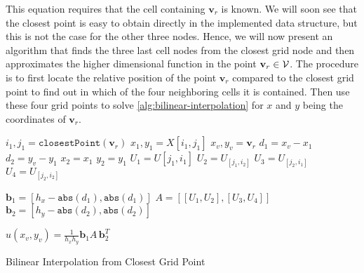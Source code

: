 This equation requires that the cell containing $\mathbf{v}_r$ is known. We will soon see that the closest point is easy to obtain directly in the implemented data structure, but this is not the case for the other three nodes. Hence, we will now present an algorithm that finds the three last cell nodes from the closest grid node and then approximates the higher dimensional function in the point $\mathbf{v}_r \in \mathcal{V}$. The procedure is to first locate the relative position of the point $\mathbf{v}_r$ compared to the closest grid point to find out in which of the four neighboring cells it is contained. Then use these four grid points to solve \eqref{alg:bilinear-interpolation} for $x$ and $y$ being the coordinates of $\mathbf{v}_r$.
\clearpage

\begin{algorithm}[H]
\SetAlgoLined
$i_1, j_1 = \texttt{closestPoint}(\mathbf{v}_r)$ 
$x_1, y_1 = X[i_1, j_1]$  
$x_v, y_v = \mathbf{v}_r$   
$d_1 = x_v-x_1$ \;
$d_2 = y_v - y_1$ \;
$x_2 = x_1$\;
$y_2 = y_1$ \;
$U_1 = U[j_1, i_1]$ \;
$U_2 = U_[j_1, i_2]$ \;
$U_3 = U_[j_2, i_1]$ \;
$U_4 = U_[j_2, i_2]$ \;

$\mathbf{b}_1 = [h_x - \texttt{abs}(d_1), \texttt{abs}(d_1)]$ \;
$A = [[U_1, U_2], [U_3, U_4]]$ \;
$\mathbf{b}_2 = [h_y - \texttt{abs}(d_2), \texttt{abs}(d_2)]$ \;

$u(x_v, y_v) = \frac{1}{h_x h_y} \mathbf{b}_1 A \,\textbf{b}_2^T$ \;

 \caption{Bilinear Interpolation from Closest Grid Point}
 \label{alg:bilinear-interpolation}
\end{algorithm}

\clearpage